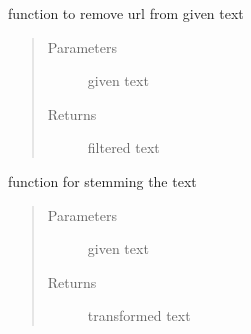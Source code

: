 \documentclass[letterpaper,10pt,english]{sphinxmanual}
\begin{document}

\begin{fulllineitems}
\label{\detokenize{index:data_preprocessing.data_preprocessing_functions.remove_urls}}
\sphinxAtStartPar
function to remove url from given text
\begin{quote}\begin{description}
\item[{Parameters}] \leavevmode
\sphinxAtStartPar
{} \textendash{} given text

\item[{Returns}] \leavevmode
\sphinxAtStartPar
filtered text

\end{description}\end{quote}

\end{fulllineitems}


\begin{fulllineitems}
\label{\detokenize{index:data_preprocessing.data_preprocessing_functions.stemming_text}}
\sphinxAtStartPar
function for stemming the text
\begin{quote}\begin{description}
\item[{Parameters}] \leavevmode
\sphinxAtStartPar
{} \textendash{} given text

\item[{Returns}] \leavevmode
\sphinxAtStartPar
transformed text

\end{description}\end{quote}

\end{fulllineitems}
\end{document}
